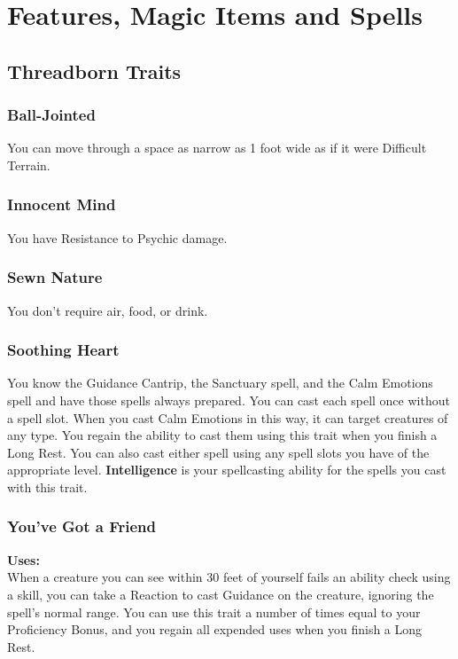 \documentclass[letterpaper,openany,oneside,twocolumn]{book}
\begin{document}
\onecolumn


\rendercharactersheet

\renderbackgroundsheet

\renderspellsheet


\restoregeometry
\twocolumn

\chapter*{Features, Magic Items and Spells}

\section*{Threadborn Traits}
\subsection*{Ball-Jointed}
You can move through a space as narrow as 1 foot wide as if it were Difficult Terrain.
\subsection*{Innocent Mind}
You have Resistance to Psychic damage.
\subsection*{Sewn Nature}
You don't require air, food, or drink.
\subsection*{Soothing Heart}
You know the Guidance Cantrip, the Sanctuary spell, and the Calm Emotions spell and have those spells always prepared. You can cast each spell once without a spell slot. When you cast Calm Emotions in this way, it can target creatures of any type. You regain the ability to cast them using this trait when you finish a Long Rest. You can also cast either spell using any spell slots you have of the appropriate level. \textbf{Intelligence} is your spellcasting ability for the spells you cast with this trait.
\subsection*{You've Got a Friend}
\textbf{Uses: }\\
When a creature you can see within 30 feet of yourself fails an ability check using a skill, you can take a Reaction to cast Guidance on the creature, ignoring the spell's normal range. You can use this trait a number of times equal to your Proficiency Bonus, and you regain all expended uses when you finish a Long Rest.
\end{document}
